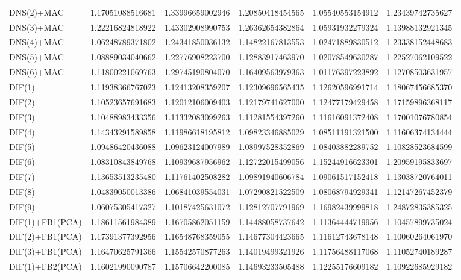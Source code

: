 \begin{table}[h]
\begin{adjustbox}{totalheight=\baselineskip}
\begin{tabular}{lSSSSS}
DNS(2)+MAC & 1.17051088516681 & 1.33996659002946 & 1.20850418454565 & 1.05540553154912 & 1.23439742735627 \\ 
DNS(3)+MAC & 1.22216824818922 & 1.43302908990753 & 1.26362654382864 & 1.05931932279324 & 1.13988132921345 \\ 
DNS(4)+MAC & 1.06248789371802 & 1.24341850036132 & 1.14822167813553 & 1.02471889830512 & 1.23338152448683 \\ 
DNS(5)+MAC & 1.08889034040662 & 1.22776908223700 & 1.12883917463970 & 1.02078549630287 & 1.22527062109522 \\ 
DNS(6)+MAC & 1.11800221069763 & 1.29745190804070 & 1.16409563979363 & 1.01176397223892 & 1.12708503631957 \\ 
DIF(1) & 1.11938366767023 & 1.12413208359207 & 1.12309696565435 & 1.12620596991714 & 1.18067456685370 \\ 
DIF(2) & 1.10523657691683 & 1.12012106009403 & 1.12179741627000 & 1.12477179429458 & 1.17159896368117 \\ 
DIF(3) & 1.10488983433356 & 1.11332083099263 & 1.11281554397260 & 1.11616091372408 & 1.17001076780854 \\ 
DIF(4) & 1.14343291589858 & 1.11986618195812 & 1.09823346885029 & 1.08511191321500 & 1.11606374134444 \\ 
DIF(5) & 1.09486420436088 & 1.09623124007989 & 1.08997528352869 & 1.08403882289752 & 1.10828523684599 \\ 
DIF(6) & 1.08310843849768 & 1.10939687956962 & 1.12722015499056 & 1.15244916623301 & 1.20959195833697 \\ 
DIF(7) & 1.13653513235480 & 1.11761402508282 & 1.09891940606784 & 1.09061517152418 & 1.13038720764011 \\ 
DIF(8) & 1.04839050013386 & 1.06841039554031 & 1.07290821522509 & 1.08068794929341 & 1.12147267452379 \\ 
DIF(9) & 1.06075305417327 & 1.10187425631072 & 1.12812707791969 & 1.16982439999818 & 1.24872835385325 \\ 
DIF(1)+FB1(PCA) & 1.18611561984389 & 1.16705862051159 & 1.14488058737642 & 1.11364444719956 & 1.10457899735024 \\ 
DIF(2)+FB1(PCA) & 1.17391377392956 & 1.16548768359055 & 1.14677304423665 & 1.11612743678148 & 1.10060264061970 \\ 
DIF(3)+FB1(PCA) & 1.16470625791366 & 1.15542570877263 & 1.14019499321926 & 1.11756488117068 & 1.11052740189287 \\ 
DIF(1)+FB2(PCA) & 1.16021990090787 & 1.15706642200085 & 1.14693233505488 & 1.12255176609182 & 1.10922685929182 \\ 

\end{tabular}
\end{adjustbox}
\end{table}
